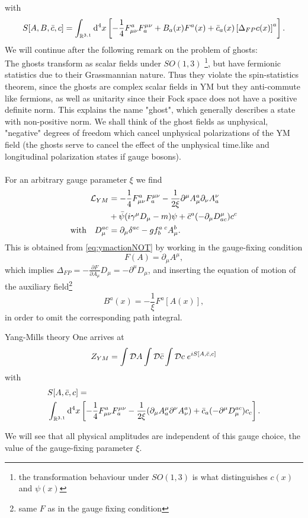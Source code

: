 with
\begin{equation}
	\label{eq:ymactionNOT}
	S[A,B,\bar{c},c] = \int_{\mathbb{R}^{3,1}} \mathrm{d}^4 x \left[- \frac{1}{4} F^a_{\mu \nu} F^{\mu \nu}_a + B_a(x) F^a(x) + \bar{c}_a(x) \left[\Delta_{FP} c(x)\right]^a\right].
\end{equation}
We will continue after the following remark on the problem of ghosts:\\
The ghosts transform as scalar fields under $SO(1,3)$ \footnote{ the transformation behaviour under $SO(1,3)$ is what distinguishes $c(x)$ and $\psi(x)$}, but have fermionic statistics due to their Grassmannian nature. Thus they violate the spin-statistics theorem, since the ghosts are complex scalar fields in YM but they anti-commute like fermions, as well as unitarity since their Fock space does not have a positive definite norm. This explains the name "ghost", which generally describes a state with non-positive norm. We shall think of the ghost fields as unphysical, "negative" degrees of freedom which cancel unphysical polarizations of the YM field (the ghosts serve to cancel the effect of the unphysical time.like and longitudinal polarization states if gauge bosons).\\
\\
For an arbitrary gauge parameter $\xi$ we find
\begin{align}
	\mathcal{L}_{YM} &= - \frac{1}{4} F^a_{\mu \nu} F^{\mu \nu}_a - \frac{1}{2 \xi} \partial^\mu A^a_\mu \partial_\nu A^\nu_a \\
	& + \bar{\psi} (i \gamma^\mu D_\mu -m) \psi + \bar{c}^a (-\partial_\mu D^\mu_{ac}) {c}^c\nonumber \\
	\text{with} \quad D^{ac}_\mu &= \partial_\mu \delta^{ac} - g f^{a\;c}_b A^b_\mu.
\end{align}
This is obtained from \ref{eq:ymactionNOT} by working in the gauge-fixing condition \begin{equation}
	F(A)=\partial_\mu A^\mu,
\end{equation}
which implies $\Delta_{FP} = - \frac{\partial F}{\partial A_\mu}D_\mu = -\partial^\mu D_\mu$, and inserting the equation of motion of the auxiliary field\footnote{same $F$ as in the gauge fixing condition}
\begin{equation}
B^a(x) = - \frac{1}{\xi} F^a [A(x) ] ,
\end{equation}
in order to omit the corresponding path integral.
\begin{mybox}{Yang-Mills theory}
	One arrives at
	\begin{equation}
		\label{eq:ympartitionfunction}
		Z_{YM} = \int \mathcal{D} A \int \mathcal{D} \bar{c} \int \mathcal{D} c\; e^{i S[A,\bar{c}, c]}
	\end{equation}
	with 
	\begin{align}
		&S[A,\bar{c},c]= \\
		& \int_{\mathbb{R}^{3,1}} \mathrm{d}^4 x \left[- \frac{1}{4} F^a_{\mu \nu} F^{\mu \nu}_a - \frac{1}{2 \xi} (\partial_\mu A^\mu_a \partial^\nu A^a_\nu) + \bar{c}_a(-\partial^\mu D^{ac}_\mu) c_c\right] \nonumber.
	\end{align}
\end{mybox}
We will see that all physical amplitudes are independent of this gauge choice, the value of the gauge-fixing parameter $\xi$.
